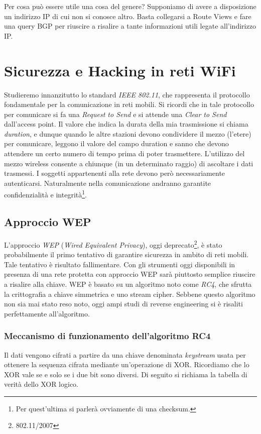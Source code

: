 \documentclass[14pt]{extreport}
\begin{document}
Per cosa può essere utile una cosa del genere? Supponiamo di avere a disposizione un indirizzo IP di cui non si conosce altro. Basta collegarsi a Route Views e fare una query BGP per riuscire a risalire a tante informazioni utili legate all'indirizzo IP.




\chapter{Sicurezza e Hacking in reti WiFi}


Studieremo innanzitutto lo standard \textit{IEEE 802.11}, che rappresenta il protocollo fondamentale per la comunicazione in reti mobili. Si ricordi che in tale protocollo per comunicare si fa una \textit{Request to Send} e si attende una \textit{Clear to Send} dall'access point. Il valore che indica la durata della mia trasmissione si chiama \textit{duration}, e dunque quando le altre stazioni devono condividere il mezzo (l'etere) per comunicare, leggono il valore del campo duration e sanno che devono attendere un certo numero di tempo prima di poter trasmettere. 
L'utilizzo del mezzo wireless consente a chiunque (in un determinato raggio) di ascoltare i dati trasmessi. I soggetti appartenenti alla rete devono però necessariamente autenticarsi. Naturalmente nella comunicazione andranno garantite confidenzialità e integrità\footnote{Per quest'ultima si parlerà ovviamente di una checksum.}.


\section{Approccio WEP}
L'approccio \textit{WEP} (\textit{Wired Equivalent Privacy}), oggi deprecato\footnote{802.11/2007}, è stato probabilmente il primo tentativo di garantire sicurezza in ambito di reti mobili. Tale tentativo è risultato fallimentare. Con gli strumenti oggi disponibili in presenza di una rete protetta con approccio WEP sarà piuttosto semplice riuscire a risalire alla chiave.
WEP è basato su un algoritmo noto come \textit{RC4}, che sfrutta la crittografia a chiave simmetrica e uno stream cipher. Sebbene questo algoritmo non sia mai stato reso noto, oggi ampi studi di reverse engineering si è risaliti perfettamente all'algoritmo.

\subsection{Meccanismo di funzionamento dell'algoritmo RC4}
Il dati vengono cifrati a partire da una chiave denominata \textit{keystream} usata per ottenere la sequenza cifrata mediante un'operazione di XOR. Ricordiamo che lo XOR vale  se e solo se i due bit sono diversi. Di seguito si richiama la tabella di verità dello XOR logico.
\end{document}
